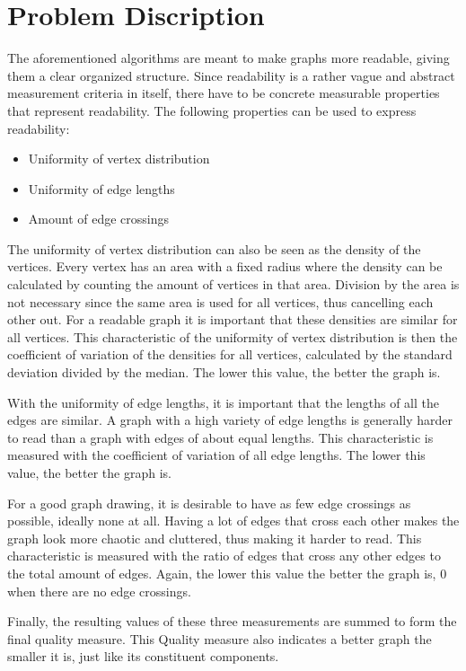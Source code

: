 \documentclass[a4paper,12pt]{article}
\begin{document}
  \section{Problem Discription}
    The aforementioned algorithms are meant to make graphs more readable, giving them a clear organized structure.
    Since readability is a rather vague and abstract measurement criteria in itself, there have to be concrete measurable properties that represent readability.
    The following properties can be used to express readability: \cite{kobourov2012spring}
    \begin{itemize}
      \item Uniformity of vertex distribution
      \item Uniformity of edge lengths
      \item Amount of edge crossings
    \end{itemize}
    The uniformity of vertex distribution can also be seen as the density of the vertices.
    Every vertex has an area with a fixed radius where the density can be calculated by counting the amount of vertices in that area. Division by the area is not necessary since the same area is used for all vertices, thus cancelling each other out.
    For a readable graph it is important that these densities are similar for all vertices.
    This characteristic of the uniformity of vertex distribution is then the coefficient of variation of the densities for all vertices, calculated by the standard deviation divided by the median. The lower this value, the better the graph is.

    With the uniformity of edge lengths, it is important that the lengths of all the edges are similar.
    A graph with a high variety of edge lengths is generally harder to read than a graph with edges of about equal lengths.
    This characteristic is measured with the coefficient of variation of all edge lengths. The lower this value, the better the graph is.

    For a good graph drawing, it is desirable to have as few edge crossings as possible, ideally none at all.
    Having a lot of edges that cross each other makes the graph look more chaotic and cluttered, thus making it harder to read. This characteristic is measured with the ratio of edges that cross any other edges to the total amount of edges. Again, the lower this value the better the graph is, $0$ when there are no edge crossings.

	Finally, the resulting values of these three measurements are summed to form the final quality measure. This Quality measure also indicates a better graph the smaller it is, just like its constituent components.
\end{document}
